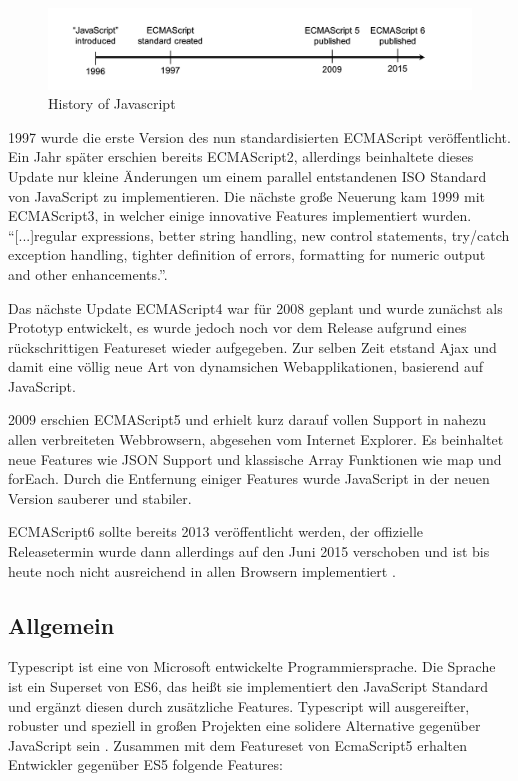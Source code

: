 \begin{figure}[hp]
 \centering
 \includegraphics[width=\linewidth]{kapitel2/javascript-timeline.png}
 \caption{History of Javascript \cite[28]{EssentialTS}}
\end{figure}

1997 wurde die erste Version des nun standardisierten ECMAScript veröffentlicht. Ein Jahr später erschien bereits ECMAScript2,
allerdings beinhaltete dieses Update nur kleine Änderungen um einem parallel entstandenen ISO Standard von JavaScript zu implementieren.
Die nächste große Neuerung kam 1999 mit ECMAScript3, in welcher einige innovative Features implementiert wurden.
``[...]regular expressions, better string handling, new control statements, try/catch exception handling, tighter definition of errors, formatting for numeric output and other enhancements.''\cite{js-vs-es}.

Das nächste Update ECMAScript4 war für 2008 geplant und wurde zunächst als Prototyp entwickelt,
es wurde jedoch noch vor dem Release aufgrund eines rückschrittigen Featureset wieder aufgegeben.
Zur selben Zeit etstand Ajax und damit eine völlig neue Art von dynamsichen Webapplikationen,
basierend auf JavaScript.

2009 erschien ECMAScript5 und erhielt kurz darauf vollen Support in nahezu allen verbreiteten Webbrowsern, abgesehen vom Internet Explorer.
Es beinhaltet neue Features wie \ac{JSON} Support und klassische Array Funktionen wie map und forEach.
Durch die Entfernung einiger Features wurde JavaScript in der neuen Version sauberer und stabiler.

ECMAScript6 sollte bereits 2013 veröffentlicht werden, der offizielle Releasetermin wurde
dann allerdings auf den Juni 2015 verschoben und ist bis heute noch nicht ausreichend in allen Browsern implementiert
\cite{js-vs-es}.

\subsection{Allgemein}

Typescript ist eine von Microsoft entwickelte Programmiersprache.
Die Sprache ist ein Superset von ES6, das heißt sie implementiert den JavaScript Standard und ergänzt diesen
durch zusätzliche Features.
Typescript will ausgereifter, robuster und speziell in großen Projekten eine solidere Alternative gegenüber JavaScript sein \cite[28]{EssentialTS}.
Zusammen mit dem Featureset von EcmaScript5 erhalten Entwickler gegenüber ES5 folgende Features:

